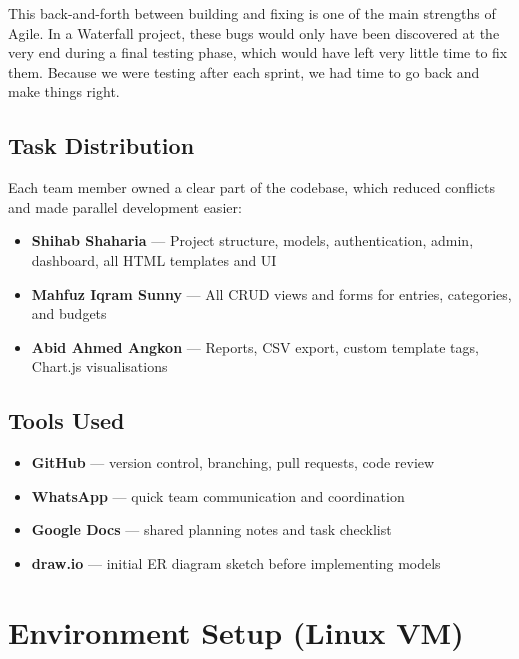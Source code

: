 \documentclass[12pt,a4paper]{report}
\begin{document}
This back-and-forth between building and fixing is one of the main strengths of Agile. In a Waterfall project, these bugs would only have been discovered at the very end during a final testing phase, which would have left very little time to fix them. Because we were testing after each sprint, we had time to go back and make things right.

\section{Task Distribution}

Each team member owned a clear part of the codebase, which reduced conflicts and made parallel development easier:

\begin{itemize}
  \item \textbf{Shihab Shaharia} --- Project structure, models, authentication, admin, dashboard, all HTML templates and UI
  \item \textbf{Mahfuz Iqram Sunny} --- All CRUD views and forms for entries, categories, and budgets
  \item \textbf{Abid Ahmed Angkon} --- Reports, CSV export, custom template tags, Chart.js visualisations
\end{itemize}

\section{Tools Used}

\begin{itemize}
  \item \textbf{GitHub} --- version control, branching, pull requests, code review
  \item \textbf{WhatsApp} --- quick team communication and coordination
  \item \textbf{Google Docs} --- shared planning notes and task checklist
  \item \textbf{draw.io} --- initial ER diagram sketch before implementing models
\end{itemize}

\chapter{Environment Setup (Linux VM)}
\end{document}
